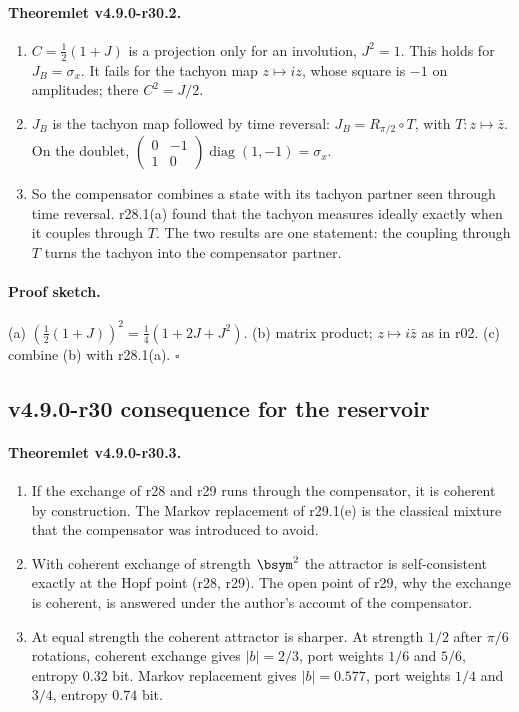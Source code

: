 \paragraph{Theoremlet v4.9.0-r30.2.}
\begin{enumerate}[leftmargin=2em]
\item[(a)] \(C=\tfrac12(1+J)\) is a projection only for an involution, \(J^2=1\).  This holds for \(J_B=\sigma_x\).  It fails for the tachyon map
\(z\mapsto iz\), whose square is \(-1\) on amplitudes; there \(C^2=J/2\).
\item[(b)] \(J_B\) is the tachyon map followed by time reversal: \(J_B=R_{\pi/2}\circ T\), with \(T\colon z\mapsto\bar z\).  On the doublet,
\(\left(\begin{smallmatrix}0&-1\\1&0\end{smallmatrix}\right)\operatorname{diag}(1,-1)=\sigma_x\).
\item[(c)] So the compensator combines a state with its tachyon partner seen through time reversal.  r28.1(a) found that the tachyon
measures ideally exactly when it couples through \(T\).  The two results are one statement: the coupling through \(T\) turns the
tachyon into the compensator partner.
\end{enumerate}

\paragraph{Proof sketch.}
(a) \((\tfrac12(1+J))^2=\tfrac14(1+2J+J^2)\).  (b) matrix product; \(z\mapsto i\bar z\) as in r02.  (c) combine (b) with r28.1(a).  \(\square\)

\subsection*{v4.9.0-r30 consequence for the reservoir}
\label{subsec:v490-r30-reservoir}

\paragraph{Theoremlet v4.9.0-r30.3.}
\begin{enumerate}[leftmargin=2em]
\item[(a)] If the exchange of r28 and r29 runs through the compensator, it is coherent by construction.  The Markov replacement of
r29.1(e) is the classical mixture that the compensator was introduced to avoid.
\item[(b)] With coherent exchange of strength \(\bsym^2\) the attractor is self-consistent exactly at the Hopf point (r28, r29).  The open
point of r29, why the exchange is coherent, is answered under the author's account of the compensator.
\item[(c)] At equal strength the coherent attractor is sharper.  At strength \(1/2\) after \(\pi/6\) rotations, coherent exchange gives
\(|b|=2/3\), port weights \(1/6\) and \(5/6\), entropy \(0.32\) bit.  Markov replacement gives \(|b|=0.577\), port weights \(1/4\) and \(3/4\),
entropy \(0.74\) bit.
\end{enumerate}

